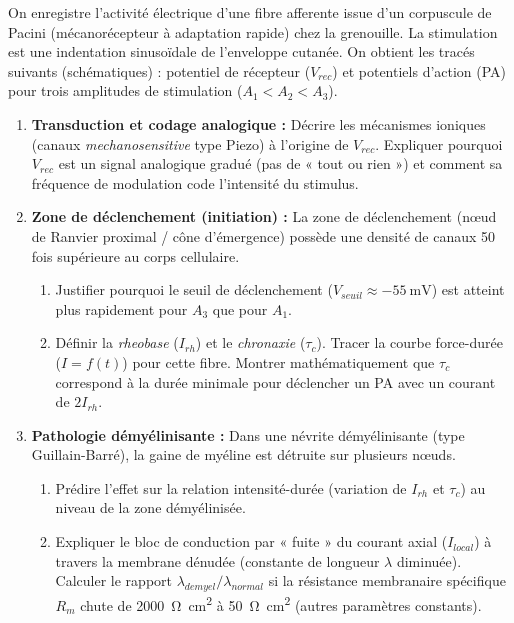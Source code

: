 \documentclass[11pt]{article}
\begin{document}
\begin{exercice}
On enregistre l'activité électrique d'une fibre afferente issue d'un corpuscule de Pacini (mécanorécepteur à adaptation rapide) chez la grenouille. La stimulation est une indentation sinusoïdale de l'enveloppe cutanée. On obtient les tracés suivants (schématiques) : potentiel de récepteur ($V_{rec}$) et potentiels d'action (PA) pour trois amplitudes de stimulation ($A_1 < A_2 < A_3$).

\begin{enumerate}
    \item \textbf{Transduction et codage analogique :} Décrire les mécanismes ioniques (canaux \textit{mechanosensitive} type Piezo) à l'origine de $V_{rec}$. Expliquer pourquoi $V_{rec}$ est un signal analogique gradué (pas de « tout ou rien ») et comment sa fréquence de modulation code l'intensité du stimulus.
    \item \textbf{Zone de déclenchement (initiation) :} La zone de déclenchement (nœud de Ranvier proximal / cône d'émergence) possède une densité de canaux  50 fois supérieure au corps cellulaire.
    \begin{enumerate}
        \item Justifier pourquoi le seuil de déclenchement ($V_{seuil} \approx \SI{-55}{\milli\volt}$) est atteint plus rapidement pour $A_3$ que pour $A_1$.
        \item Définir la \textit{rheobase} ($I_{rh}$) et le \textit{chronaxie} ($\tau_c$). Tracer la courbe force-durée ($I = f(t)$) pour cette fibre. Montrer mathématiquement que $\tau_c$ correspond à la durée minimale pour déclencher un PA avec un courant de $2 I_{rh}$.
    \end{enumerate}
    \item \textbf{Pathologie démyélinisante :} Dans une névrite démyélinisante (type Guillain-Barré), la gaine de myéline est détruite sur plusieurs nœuds.
    \begin{enumerate}
        \item Prédire l'effet sur la relation intensité-durée (variation de $I_{rh}$ et $\tau_c$) au niveau de la zone démyélinisée.
        \item Expliquer le bloc de conduction par « fuite » du courant axial ($I_{local}$) à travers la membrane dénudée (constante de longueur $\lambda$ diminuée). Calculer le rapport $\lambda_{demyel}/\lambda_{normal}$ si la résistance membranaire spécifique $R_m$ chute de \SI{2000}{\ohm\centi\meter^2} à \SI{50}{\ohm\centi\meter^2} (autres paramètres constants).
    \end{enumerate}
\end{enumerate}
\end{exercice}
\end{document}
